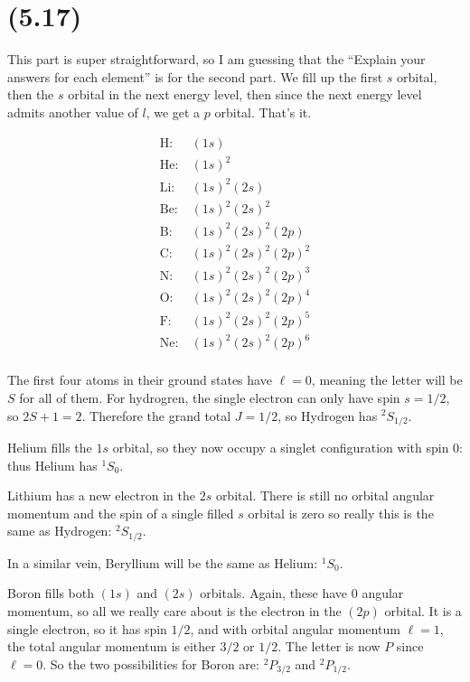 \section{(5.17)}

\begin{parts}
\item This part is super straightforward, so I am guessing that the ``Explain your answers for each element'' is for the second part. We fill up the first $s$ orbital, then the $s$ orbital in the next energy level, then since the next energy level admits another value of $l$, we get a $p$ orbital. That's it.

  \begin{align*}
    \text{H:}& \ (1s) \\
    \text{He:}&\ (1s)^2 \\
    \text{Li:}&\ (1s)^2(2s) \\
    \text{Be:}&\ (1s)^2(2s)^2 \\
    \text{B:}&\ (1s)^2(2s)^2(2p) \\
    \text{C:}&\ (1s)^2(2s)^2(2p)^2 \\
    \text{N:}&\ (1s)^2(2s)^2(2p)^3 \\
    \text{O:}&\ (1s)^2(2s)^2(2p)^4 \\
    \text{F:}&\ (1s)^2(2s)^2(2p)^5 \\
    \text{Ne:}&\ (1s)^2(2s)^2(2p)^6 \\
  \end{align*}


\item The first four atoms in their ground states have $\ell=0$, meaning the letter will be $S$ for all of them. For hydrogren, the single electron can only have spin $s=1/2$, so $2S+1 = 2$. Therefore the grand total $J=1/2$, so Hydrogen has $^2 S_{1/2}$.

  Helium fills the $1s$ orbital, so they now occupy a singlet configuration with spin 0: thus Helium has $^1 S_0$.

  Lithium has a new electron in the $2s$ orbital. There is still no orbital angular momentum and the spin of a single filled $s$ orbital is zero so really this is the same as Hydrogen: $^2 S_{1/2}$.

  In a similar vein, Beryllium will be the same as Helium: $^1 S_0$.

  Boron fills both $(1s)$ and $(2s)$ orbitals. Again, these have 0 angular momentum, so all we really care about is the electron in the $(2p)$ orbital. It is a single electron, so it has spin $1/2$, and with orbital angular momentum $\ell=1$, the total angular momentum is either $3/2$ or $1/2$. The letter is now $P$ since $\ell=0$. So the two possibilities for Boron are: $^2P_{3/2}$ and $^2P_{1/2}$.


\end{parts}
